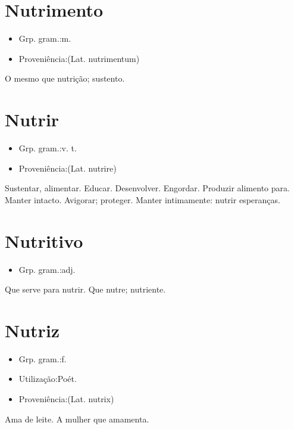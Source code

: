 \section{Nutrimento}
\begin{itemize}
\item {Grp. gram.:m.}
\end{itemize}
\begin{itemize}
\item {Proveniência:(Lat. \textunderscore nutrimentum\textunderscore )}
\end{itemize}
O mesmo que \textunderscore nutrição\textunderscore ; sustento.
\section{Nutrir}
\begin{itemize}
\item {Grp. gram.:v. t.}
\end{itemize}
\begin{itemize}
\item {Proveniência:(Lat. \textunderscore nutrire\textunderscore )}
\end{itemize}
Sustentar, alimentar.
Educar.
Desenvolver.
Engordar.
Produzir alimento para.
Manter intacto.
Avigorar; proteger.
Manter intimamente: \textunderscore nutrir esperanças\textunderscore .
\section{Nutritivo}
\begin{itemize}
\item {Grp. gram.:adj.}
\end{itemize}
Que serve para nutrir.
Que nutre; nutriente.
\section{Nutriz}
\begin{itemize}
\item {Grp. gram.:f.}
\end{itemize}
\begin{itemize}
\item {Utilização:Poét.}
\end{itemize}
\begin{itemize}
\item {Proveniência:(Lat. \textunderscore nutrix\textunderscore )}
\end{itemize}
Ama de leite.
A mulher que amamenta.
